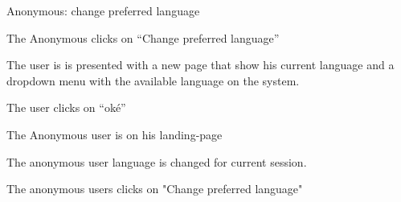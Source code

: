 \begin{uc}{Anonymous: change preferred language}

    \begin{uc-mss}
    \item The Anonymous clicks on ``Change preferred language''
    \item The user is is presented with a new page that show his current language and a dropdown menu with the available language on the system.
    \item The user clicks on ``oké''
    \end{uc-mss}

    \begin{uc-pre}
    \item The Anonymous user is on his landing-page
    \end{uc-pre}

    \begin{uc-post}
    \item The anonymous user language is changed for current session.
    \end{uc-post}

    \begin{uc-trig}
        The anonymous users clicks on "Change preferred language"
    \end{uc-trig}

\end{uc}
